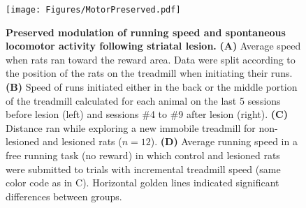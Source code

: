 \begin{figure}[h!]
 \begin{center}
	\texttt{[image: Figures/MotorPreserved.pdf]}
	\caption
	{\textbf{Preserved modulation of running speed and spontaneous locomotor activity following striatal lesion.}
	\textbf{(A)} Average speed when rats ran toward the reward area. Data were split according to the position of the rats on the treadmill when initiating their runs.
	\textbf{(B)} Speed of runs initiated either in the back or the middle portion of the treadmill calculated for each animal on the last 5 sessions before lesion (left) and sessions \#4 to \#9 after lesion (right).
	\textbf{(C)} Distance ran while exploring a new immobile treadmill for non-lesioned and lesioned rats ($n=12$).
	\textbf{(D)} Average running speed in a free running task (no reward) in which control and lesioned rats were submitted to trials with incremental treadmill speed (same color code as in C).
	Horizontal golden lines indicated significant differences between groups.
	}
	\label{fig3}
 \end{center}
\end{figure}
